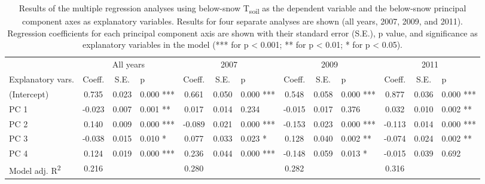 
\begin{sidewaystable}

\centering

\caption{Results of the multiple regression analyses using below-snow T\textsubscript{soil} as the dependent variable and the below-snow principal component axes as explanatory variables. Results for four separate analyses are shown (all years, 2007, 2009, and 2011). Regression coefficients for each principal component axis are shown with their standard error (S.E.), p value, and significance as explanatory variables in the model (*** for p < 0.001; ** for p < 0.01; * for p < 0.05).\label{reg_winter_tsoil_t}}


\begin{tabular}{lcclcclcclccl}
\toprule
{} & \multicolumn{3}{c}{All years}& \multicolumn{3}{c}{2007}& \multicolumn{3}{c}{2009}& \multicolumn{3}{c}{2011}\\

\cmidrule(l){2-4} \cmidrule(l){5-7} \cmidrule(l){8-10} \cmidrule(l){11-13}
Explanatory vars. &Coeff. &S.E. &p & Coeff. &S.E. &p & Coeff. &S.E. &p & Coeff. &S.E. &p \\
\midrule
(Intercept)	&0.735	&0.023	&0.000	***	&0.661	&0.050	&0.000	***	&0.548	&0.058	&0.000	***	&0.877	&0.036	&0.000	***\\
PC 1	&-0.023	&0.007	&0.001	**	&0.017	&0.014	&0.234		&-0.015	&0.017	&0.376		&0.032	&0.010	&0.002	**\\
PC 2	&0.140	&0.009	&0.000	***	&-0.089	&0.021	&0.000	***	&-0.153	&0.023	&0.000	***	&-0.113	&0.014	&0.000	***\\
PC 3	&-0.038	&0.015	&0.010	*	&0.077	&0.033	&0.023	*	&0.128	&0.040	&0.002	**	&-0.074	&0.024	&0.002	**\\
PC 4	&0.124	&0.019	&0.000	***	&0.236	&0.044	&0.000	***	&-0.148	&0.059	&0.013	*	&-0.015	&0.039	&0.692	\\
Model adj. R\textsuperscript{2}	&0.216	&	&	&	0.280	&	&	&	0.282	&	&	&	0.316	&	&	\\
\bottomrule
\end{tabular}

\end{sidewaystable}
